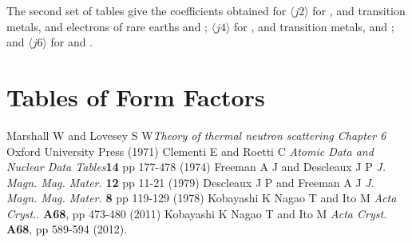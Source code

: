 \documentclass[onecolumn,12pt,a4paper,]{report}
\begin{document}
The second set of tables give the coefficients obtained for  
$\langle j2\rangle$ for ,  and  transition metals, 
 and  electrons of rare earths  and ;
 $\langle j4\rangle$ for  ,  and  transition metals, 
 and ;
and $\langle j6\rangle$ for  and . 
\chapter{Tables of Form Factors}
\newpage


\begin{thebibliography}{99}
Marshall W and Lovesey S W{\it Theory of thermal neutron
scattering Chapter 6} Oxford University Press (1971)
 Clementi E and Roetti C {\it Atomic Data and Nuclear Data
Tables}{\bf 14} pp 177-478 (1974)
Freeman A J and Descleaux J P {\it J. Magn. Mag. Mater.} {\bf 12}
pp 11-21 (1979)
Descleaux J P and Freeman A J {\it J. Magn. Mag. Mater.} {\bf 8} pp 119-129 (1978)
Kobayashi K Nagao T and Ito M {\it Acta Cryst.}. {\bf A68}, pp 473-480  (2011)
Kobayashi K Nagao T and Ito M {\it Acta Cryst.}  {\bf A68}, pp  589-594 (2012).

\end{thebibliography}
\end{document}
